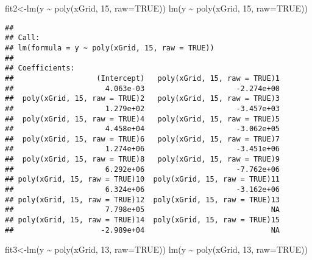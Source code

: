 \documentclass[
]{article}
\newenvironment{Shaded}{\begin{snugshade}}{\end{snugshade}}
\newcommand{\AttributeTok}[1]{\textcolor[rgb]{0.77,0.63,0.00}{#1}}
\newcommand{\ConstantTok}[1]{\textcolor[rgb]{0.00,0.00,0.00}{#1}}
\newcommand{\DecValTok}[1]{\textcolor[rgb]{0.00,0.00,0.81}{#1}}
\newcommand{\FunctionTok}[1]{\textcolor[rgb]{0.00,0.00,0.00}{#1}}
\newcommand{\NormalTok}[1]{#1}
\newcommand{\OtherTok}[1]{\textcolor[rgb]{0.56,0.35,0.01}{#1}}
\newcommand{\SpecialCharTok}[1]{\textcolor[rgb]{0.00,0.00,0.00}{#1}}
\begin{document}
\begin{Shaded}
\begin{Highlighting}[]
\NormalTok{fit2}\OtherTok{\textless{}{-}}\FunctionTok{lm}\NormalTok{(y }\SpecialCharTok{\textasciitilde{}} \FunctionTok{poly}\NormalTok{(xGrid, }\DecValTok{15}\NormalTok{, }\AttributeTok{raw=}\ConstantTok{TRUE}\NormalTok{))}
\FunctionTok{lm}\NormalTok{(y }\SpecialCharTok{\textasciitilde{}} \FunctionTok{poly}\NormalTok{(xGrid, }\DecValTok{15}\NormalTok{, }\AttributeTok{raw=}\ConstantTok{TRUE}\NormalTok{))}
\end{Highlighting}
\end{Shaded}

\begin{verbatim}
## 
## Call:
## lm(formula = y ~ poly(xGrid, 15, raw = TRUE))
## 
## Coefficients:
##                   (Intercept)   poly(xGrid, 15, raw = TRUE)1  
##                     4.063e-03                     -2.274e+00  
##  poly(xGrid, 15, raw = TRUE)2   poly(xGrid, 15, raw = TRUE)3  
##                     1.279e+02                     -3.457e+03  
##  poly(xGrid, 15, raw = TRUE)4   poly(xGrid, 15, raw = TRUE)5  
##                     4.458e+04                     -3.062e+05  
##  poly(xGrid, 15, raw = TRUE)6   poly(xGrid, 15, raw = TRUE)7  
##                     1.274e+06                     -3.451e+06  
##  poly(xGrid, 15, raw = TRUE)8   poly(xGrid, 15, raw = TRUE)9  
##                     6.292e+06                     -7.762e+06  
## poly(xGrid, 15, raw = TRUE)10  poly(xGrid, 15, raw = TRUE)11  
##                     6.324e+06                     -3.162e+06  
## poly(xGrid, 15, raw = TRUE)12  poly(xGrid, 15, raw = TRUE)13  
##                     7.798e+05                             NA  
## poly(xGrid, 15, raw = TRUE)14  poly(xGrid, 15, raw = TRUE)15  
##                    -2.989e+04                             NA
\end{verbatim}

\begin{Shaded}
\begin{Highlighting}[]
\NormalTok{fit3}\OtherTok{\textless{}{-}}\FunctionTok{lm}\NormalTok{(y }\SpecialCharTok{\textasciitilde{}} \FunctionTok{poly}\NormalTok{(xGrid, }\DecValTok{13}\NormalTok{, }\AttributeTok{raw=}\ConstantTok{TRUE}\NormalTok{))}
\FunctionTok{lm}\NormalTok{(y }\SpecialCharTok{\textasciitilde{}} \FunctionTok{poly}\NormalTok{(xGrid, }\DecValTok{13}\NormalTok{, }\AttributeTok{raw=}\ConstantTok{TRUE}\NormalTok{))}
\end{Highlighting}
\end{Shaded}
\end{document}
